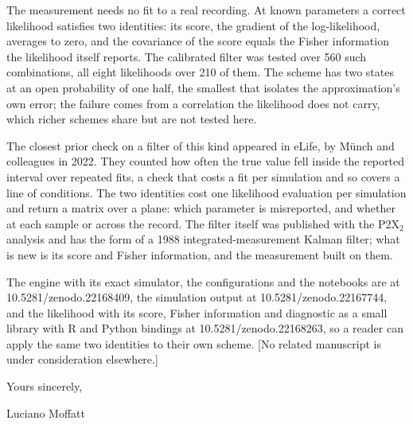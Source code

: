 \documentclass[10.5pt,a4paper]{article}
\begin{document}
The measurement needs no fit to a real recording. At known parameters a correct likelihood
satisfies two identities: its score, the gradient of the log-likelihood, averages to zero, and the
covariance of the score equals the Fisher information the likelihood itself reports. The
calibrated filter was tested over 560 such combinations, all eight likelihoods over 210 of them.
The scheme has two states at an open probability of one half, the smallest that isolates the
approximation's own error; the failure comes from a correlation the likelihood does not carry,
which richer schemes share but are not tested here.

The closest prior check on a filter of this kind appeared in eLife, by M\"unch and colleagues in
2022. They counted how often the true value fell inside the reported interval over repeated fits,
a check that costs a fit per simulation and so covers a line of conditions. The two identities
cost one likelihood evaluation per simulation and return a matrix over a plane: which parameter
is misreported, and whether at each sample or across the record. The filter itself was published
with the P2X$_2$ analysis and has the form of a 1988 integrated-measurement Kalman filter; what is
new is its score and Fisher information, and the measurement built on them.

The engine with its exact simulator, the configurations and
the notebooks are at 10.5281/zenodo.22168409, the simulation output at 10.5281/zenodo.22167744,
and the likelihood with its score, Fisher information and diagnostic as a small library with R
and Python bindings at 10.5281/zenodo.22168263, so a reader can apply the same two identities to
their own scheme. [No related manuscript is under
consideration elsewhere.]

Yours sincerely,

\vspace{1.5em}

Luciano Moffatt
\end{document}
